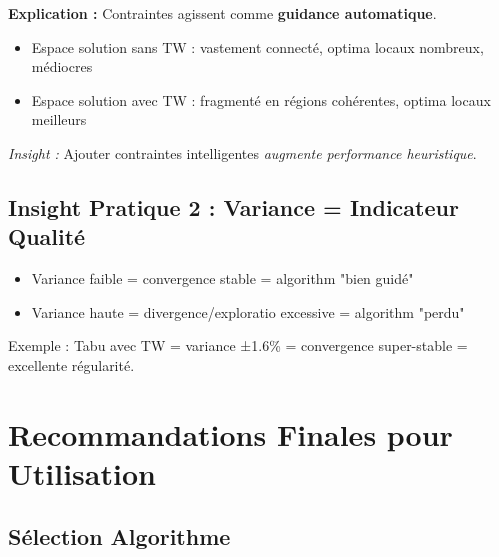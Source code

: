 \documentclass[12pt,a4paper,twoside]{report}
\begin{document}
\textbf{Explication :} Contraintes agissent comme \textbf{guidance automatique}.

\begin{itemize}
    \item Espace solution sans TW : vastement connecté, optima locaux nombreux, médiocres
    \item Espace solution avec TW : fragmenté en régions cohérentes, optima locaux
          meilleurs
\end{itemize}

\textit{Insight :} Ajouter contraintes intelligentes \textit{augmente performance heuristique}.

\subsection{Insight Pratique 2 : Variance = Indicateur Qualité}

\begin{itemize}
    \item Variance faible = convergence stable = algorithm "bien guidé"
    \item Variance haute = divergence/exploratio excessive = algorithm "perdu"
\end{itemize}

Exemple : Tabu avec TW = variance ±1.6\% = convergence super-stable =
excellente régularité.

\section{Recommandations Finales pour Utilisation}

\subsection{Sélection Algorithme}
\end{document}
